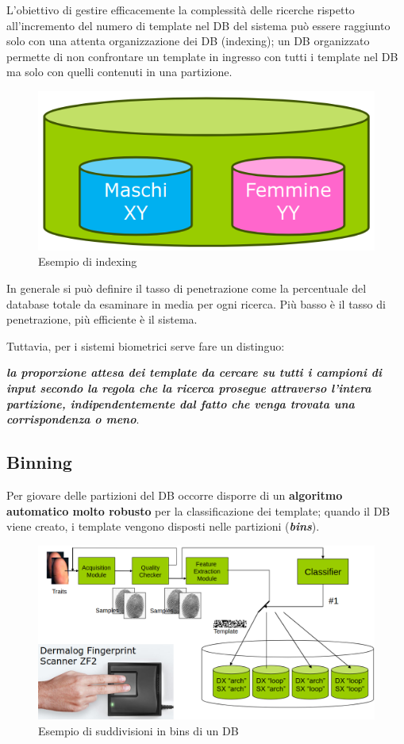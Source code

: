 L’obiettivo di gestire efficacemente la complessità delle
ricerche rispetto all’incremento del numero di template nel
DB del sistema può essere raggiunto solo con una attenta
organizzazione dei DB (indexing); un DB organizzato permette di non confrontare un
template in ingresso con tutti i template nel DB ma solo
con quelli contenuti in una partizione.

\begin{figure}[ht]
    \centering
    \includegraphics[width=0.75\linewidth]{chapters/images-chap2/indexing.png}
    \caption{Esempio di indexing}
\end{figure}

In generale si può definire il tasso di penetrazione come la
percentuale del database totale da esaminare in media per
ogni ricerca. Più basso è il tasso di penetrazione, più
efficiente è il sistema.

Tuttavia, per i sistemi biometrici serve fare un distinguo: 

\textit{\textbf{la proporzione attesa dei template da cercare su tutti i campioni di input secondo
la regola che la ricerca prosegue attraverso l'intera partizione, indipendentemente
dal fatto che venga trovata una corrispondenza o meno}}.

\subsection{Binning}

Per giovare delle partizioni del DB occorre disporre di un
\textbf{algoritmo automatico molto robusto} per la classificazione
dei template; quando il DB viene creato, i template vengono disposti nelle partizioni (\textbf{\textit{bins}}).

\begin{figure}[ht]
    \centering
    \includegraphics[width=1\linewidth]{chapters/images-chap2/binning.png}
    \caption{Esempio di suddivisioni in bins di un DB}
\end{figure}

